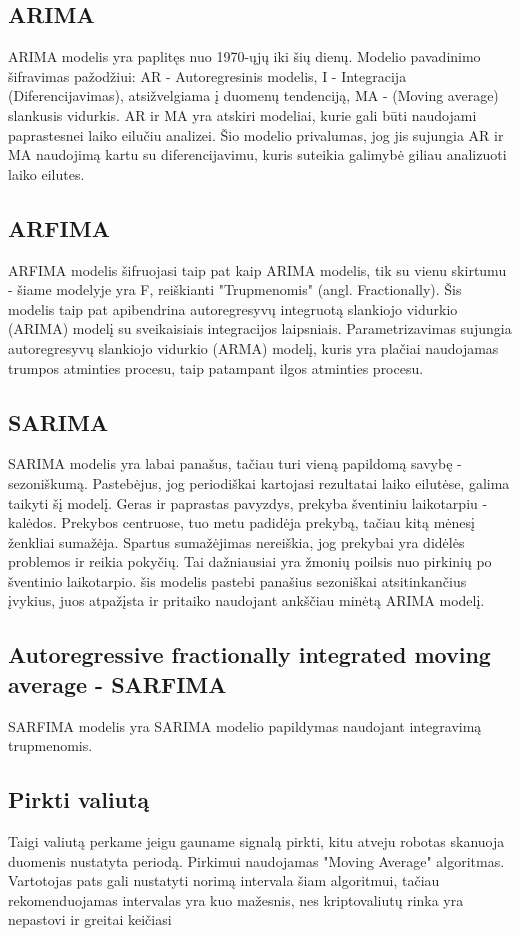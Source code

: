 \documentclass{VUMIFInfKursinis}
\begin{document}
\subsection {ARIMA}
ARIMA modelis yra paplitęs nuo 1970-ųjų iki šių dienų. Modelio pavadinimo šifravimas pažodžiui: AR - Autoregresinis modelis,
I - Integracija (Diferencijavimas), atsižvelgiama į duomenų tendenciją, MA - (Moving average) slankusis vidurkis. AR ir MA yra atskiri
modeliai, kurie gali būti naudojami paprastesnei laiko eilučiu analizei. Šio modelio privalumas, jog jis sujungia AR ir MA naudojimą kartu su
diferencijavimu, kuris suteikia galimybė giliau analizuoti laiko eilutes.

\subsection {ARFIMA}
ARFIMA modelis šifruojasi taip pat kaip ARIMA modelis, tik su vienu skirtumu - šiame modelyje yra F, reiškianti "Trupmenomis" (angl. Fractionally).
Šis modelis taip pat apibendrina autoregresyvų integruotą slankiojo vidurkio (ARIMA) modelį su sveikaisiais integracijos laipsniais.
Parametrizavimas sujungia autoregresyvų slankiojo vidurkio (ARMA) modelį, kuris yra plačiai naudojamas trumpos atminties procesu, taip 
patampant ilgos atminties procesu.

\subsection {SARIMA}
SARIMA modelis yra labai panašus, tačiau turi vieną papildomą savybę - sezoniškumą. Pastebėjus, jog periodiškai kartojasi rezultatai laiko eilutėse, 
galima taikyti šį modelį. Geras ir paprastas pavyzdys, prekyba šventiniu laikotarpiu - kalėdos. Prekybos centruose, tuo metu padidėja prekybą, tačiau 
kitą mėnesį ženkliai sumažėja. Spartus sumažėjimas nereiškia, jog prekybai yra didėlės problemos ir reikia pokyčių. Tai dažniausiai yra žmonių 
poilsis nuo pirkinių po šventinio laikotarpio. šis modelis pastebi panašius sezoniškai atsitinkančius įvykius, juos atpažįsta ir pritaiko naudojant
ankščiau minėtą ARIMA modelį. 

\subsection {Autoregressive fractionally integrated moving average - SARFIMA}
SARFIMA modelis yra SARIMA modelio papildymas naudojant integravimą trupmenomis.

\subsection{Pirkti valiutą}
Taigi valiutą perkame jeigu gauname signalą pirkti, kitu atveju robotas skanuoja duomenis nustatyta periodą. Pirkimui naudojamas "Moving Average" algoritmas. 
Vartotojas pats gali nustatyti norimą intervala šiam algoritmui, tačiau rekomenduojamas intervalas yra kuo mažesnis, nes kriptovaliutų rinka 
yra nepastovi ir greitai keičiasi 
\end{document}
